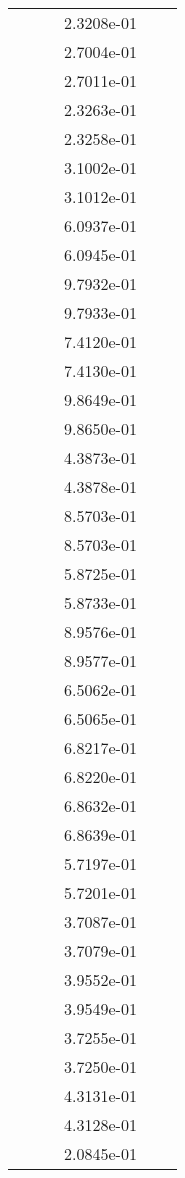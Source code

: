 \begin{xltabular}{\textwidth}{r|rS[table-format=1.3e+2]S[table-format=1.4e+2]S[table-format=1.4e+2]S[table-format=-1.5]}
&  &  & 2.3208e-01 & & \\
&  &  & 2.7004e-01 & & \\
&  &  & 2.7011e-01 & & \\
&  &  & 2.3263e-01 & & \\
&  &  & 2.3258e-01 & & \\
&  &  & 3.1002e-01 & & \\
&  &  & 3.1012e-01 & & \\
&  &  & 6.0937e-01 & & \\
&  &  & 6.0945e-01 & & \\
&  &  & 9.7932e-01 & & \\
&  &  & 9.7933e-01 & & \\
&  &  & 7.4120e-01 & & \\
&  &  & 7.4130e-01 & & \\
&  &  & 9.8649e-01 & & \\
&  &  & 9.8650e-01 & & \\
&  &  & 4.3873e-01 & & \\
&  &  & 4.3878e-01 & & \\
&  &  & 8.5703e-01 & & \\
&  &  & 8.5703e-01 & & \\
&  &  & 5.8725e-01 & & \\
&  &  & 5.8733e-01 & & \\
&  &  & 8.9576e-01 & & \\
&  &  & 8.9577e-01 & & \\
&  &  & 6.5062e-01 & & \\
&  &  & 6.5065e-01 & & \\
&  &  & 6.8217e-01 & & \\
&  &  & 6.8220e-01 & & \\
&  &  & 6.8632e-01 & & \\
&  &  & 6.8639e-01 & & \\
&  &  & 5.7197e-01 & & \\
&  &  & 5.7201e-01 & & \\
&  &  & 3.7087e-01 & & \\
&  &  & 3.7079e-01 & & \\
&  &  & 3.9552e-01 & & \\
&  &  & 3.9549e-01 & & \\
&  &  & 3.7255e-01 & & \\
&  &  & 3.7250e-01 & & \\
&  &  & 4.3131e-01 & & \\
&  &  & 4.3128e-01 & & \\
&  &  & 2.0845e-01 & & \\

\end{xltabular}
